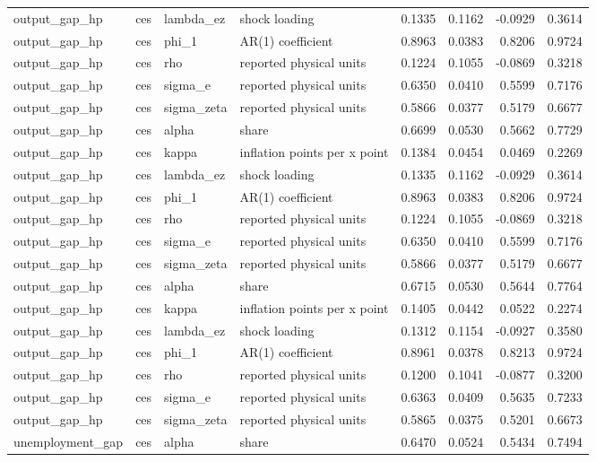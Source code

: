 \begin{tabular}{llllrrrr}
output\_gap\_hp & ces & lambda\_ez & shock loading & 0.1335 & 0.1162 & -0.0929 & 0.3614 \\
output\_gap\_hp & ces & phi\_1 & AR(1) coefficient & 0.8963 & 0.0383 & 0.8206 & 0.9724 \\
output\_gap\_hp & ces & rho & reported physical units & 0.1224 & 0.1055 & -0.0869 & 0.3218 \\
output\_gap\_hp & ces & sigma\_e & reported physical units & 0.6350 & 0.0410 & 0.5599 & 0.7176 \\
output\_gap\_hp & ces & sigma\_zeta & reported physical units & 0.5866 & 0.0377 & 0.5179 & 0.6677 \\
output\_gap\_hp & ces & alpha & share & 0.6699 & 0.0530 & 0.5662 & 0.7729 \\
output\_gap\_hp & ces & kappa & inflation points per x point & 0.1384 & 0.0454 & 0.0469 & 0.2269 \\
output\_gap\_hp & ces & lambda\_ez & shock loading & 0.1335 & 0.1162 & -0.0929 & 0.3614 \\
output\_gap\_hp & ces & phi\_1 & AR(1) coefficient & 0.8963 & 0.0383 & 0.8206 & 0.9724 \\
output\_gap\_hp & ces & rho & reported physical units & 0.1224 & 0.1055 & -0.0869 & 0.3218 \\
output\_gap\_hp & ces & sigma\_e & reported physical units & 0.6350 & 0.0410 & 0.5599 & 0.7176 \\
output\_gap\_hp & ces & sigma\_zeta & reported physical units & 0.5866 & 0.0377 & 0.5179 & 0.6677 \\
output\_gap\_hp & ces & alpha & share & 0.6715 & 0.0530 & 0.5644 & 0.7764 \\
output\_gap\_hp & ces & kappa & inflation points per x point & 0.1405 & 0.0442 & 0.0522 & 0.2274 \\
output\_gap\_hp & ces & lambda\_ez & shock loading & 0.1312 & 0.1154 & -0.0927 & 0.3580 \\
output\_gap\_hp & ces & phi\_1 & AR(1) coefficient & 0.8961 & 0.0378 & 0.8213 & 0.9724 \\
output\_gap\_hp & ces & rho & reported physical units & 0.1200 & 0.1041 & -0.0877 & 0.3200 \\
output\_gap\_hp & ces & sigma\_e & reported physical units & 0.6363 & 0.0409 & 0.5635 & 0.7233 \\
output\_gap\_hp & ces & sigma\_zeta & reported physical units & 0.5865 & 0.0375 & 0.5201 & 0.6673 \\
unemployment\_gap & ces & alpha & share & 0.6470 & 0.0524 & 0.5434 & 0.7494 \\

\end{tabular}
